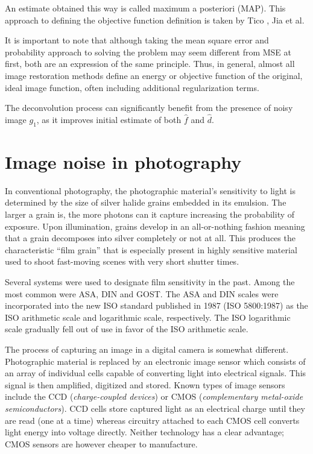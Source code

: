\documentclass[12pt,notitlepage]{report}
\begin{document}
An estimate obtained this way is called maximum a posteriori (MAP). This approach to defining the objective function definition is taken by Tico \cite{tico06} \cite{tico07}, Jia et al. \cite{jia04}


It is important to note that although taking the mean square error and probability approach to solving the problem may seem different from MSE at first, both are an expression of the same principle. Thus, in general, almost all image restoration methods define an energy or objective function of the original, ideal image function, often including additional regularization terms. 



The deconvolution process can significantly benefit from the presence of noisy image $g_1$, as it improves initial estimate of both $\hat{f}$ and $\hat{d}$.   


\section{Image noise in photography}
\label{sec:image_noise_in_photography}

In conventional photography, the photographic material’s sensitivity to light is determined by the size of silver halide grains embedded in its emulsion. The larger a grain is, the more photons can it capture increasing the probability of exposure. Upon illumination, grains develop in an all-or-nothing fashion meaning that a grain decomposes into silver completely or not at all.  This produces the characteristic “film grain” that is especially present in highly sensitive material used to shoot fast-moving scenes with very short shutter times. 

Several systems were used to designate film sensitivity in the past. Among the most common were ASA, DIN and GOST. The ASA and DIN scales were incorporated into the new ISO standard published in 1987 (ISO 5800:1987) as the ISO arithmetic scale and logarithmic scale, respectively. The ISO logarithmic scale gradually fell out of use in favor of the ISO arithmetic scale.

The process of capturing an image in a digital camera is somewhat different. Photographic material is replaced by an electronic image sensor which consists of an array of individual cells capable of converting light into electrical signals. This signal is then amplified, digitized and stored. Known types of image sensors include the CCD ({\em charge-coupled devices}) or CMOS ({\em complementary metal-oxide semiconductors}). CCD cells store captured light as an electrical charge until they are read (one at a time) whereas circuitry attached to each CMOS cell converts light energy into voltage directly. Neither technology has a clear advantage; CMOS sensors are however cheaper to manufacture.
\end{document}
